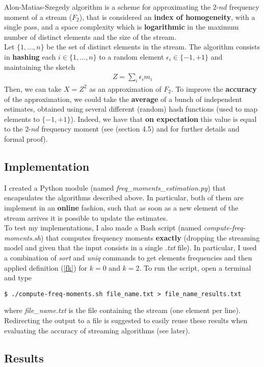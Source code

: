 Alon-Matias-Szegedy algorithm is a scheme for approximating the $2\text{-}nd$ frequency moment of a stream ($F_2$), that is considered an \textbf{index of homogeneity}, with a single pass, and a space complexity which is \textbf{logarithmic} in the maximum number of distinct elements and the size of the stream.\\
Let $\{1,\ldots,n\}$ be the set of distinct elements in the stream. The algorithm consists in \textbf{hashing} each $i \in \{1,\ldots,n\}$ to a random element $\epsilon_i \in \{-1,+1\}$ and maintaining the sketch
\begin{align}
	Z = \sum_{i} \epsilon_i m_i
\end{align}
Then, we can take $X = Z^2$ as an approximation of $F_2$. To improve the \textbf{accuracy} of the approximation, we could take the \textbf{average} of a bunch of independent estimates, obtained using several different (random) hash functions (used to map elements to $\{-1,+1\}$). Indeed, we have that \textbf{on expectation} this value is equal to the $2\text{-}nd$ frequency moment (see \cite{mmd} (section 4.5) and \cite{ams} for further details and formal proof).


\subsection{Implementation}

I created a Python module (named \textit{freq\_moments\_estimation.py}) that encapsulates the algorithms described above. In particular, both of them are implement in an \textbf{online} fashion, such that as soon as a new element of the stream arrives it is possible to update the estimates.\\
To test my implementations, I also made a Bash script (named \textit{compute-freq-moments.sh}) that computes frequency moments \textbf{exactly} (dropping the streaming model and given that the input consists in a single \textit{.txt} file). In particular, I used a combination of \textit{sort} and \textit{uniq} commands to get elements frequencies and then applied definition (\ref{fk}) for $k = 0$ and $k = 2$. To run the script, open a terminal and type
\begin{lstlisting}
$ ./compute-freq-moments.sh file_name.txt > file_name_results.txt
\end{lstlisting}
where \textit{file\_name.txt} is the file containing the stream (one element per line). Redirecting the output to a file is suggested to easily reuse these results when evaluating the accuracy of streaming algorithms (see later).


\subsection{Results}

